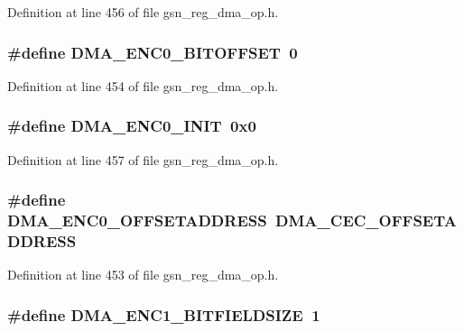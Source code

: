 Definition at line 456 of file gsn\_\-reg\_\-dma\_\-op.h.

\hypertarget{a00547_a51805221f0eead88a3117ce96401034e}{
\subsubsection[{DMA\_\-ENC0\_\-BITOFFSET}]{\setlength{\rightskip}{0pt plus 5cm}\#define DMA\_\-ENC0\_\-BITOFFSET~0}}
\label{a00547_a51805221f0eead88a3117ce96401034e}


Definition at line 454 of file gsn\_\-reg\_\-dma\_\-op.h.

\hypertarget{a00547_a471b7e728bf00f081a271e4d9d059703}{
\subsubsection[{DMA\_\-ENC0\_\-INIT}]{\setlength{\rightskip}{0pt plus 5cm}\#define DMA\_\-ENC0\_\-INIT~0x0}}
\label{a00547_a471b7e728bf00f081a271e4d9d059703}


Definition at line 457 of file gsn\_\-reg\_\-dma\_\-op.h.

\hypertarget{a00547_afd17ceb26b10783c0e9a75fb71b59c58}{
\subsubsection[{DMA\_\-ENC0\_\-OFFSETADDRESS}]{\setlength{\rightskip}{0pt plus 5cm}\#define DMA\_\-ENC0\_\-OFFSETADDRESS~DMA\_\-CEC\_\-OFFSETADDRESS}}
\label{a00547_afd17ceb26b10783c0e9a75fb71b59c58}


Definition at line 453 of file gsn\_\-reg\_\-dma\_\-op.h.

\hypertarget{a00547_a028791b275fc7885453223defe8cc621}{
\subsubsection[{DMA\_\-ENC1\_\-BITFIELDSIZE}]{\setlength{\rightskip}{0pt plus 5cm}\#define DMA\_\-ENC1\_\-BITFIELDSIZE~1}}
\label{a00547_a028791b275fc7885453223defe8cc621}


